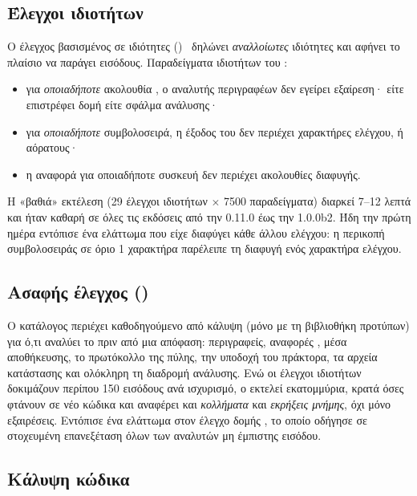 \subsection{Έλεγχοι ιδιοτήτων}

Ο έλεγχος βασισμένος σε ιδιότητες ()~\cite{claessen2000quickcheck,maciver2019hypothesis}
δηλώνει \emph{αναλλοίωτες} ιδιότητες και αφήνει το πλαίσιο να παράγει εισόδους.
Παραδείγματα ιδιοτήτων του \Probolos:

\begin{itemize}
  \item για \emph{οποιαδήποτε} ακολουθία , ο αναλυτής περιγραφέων δεν
        εγείρει εξαίρεση· είτε επιστρέφει δομή είτε σφάλμα ανάλυσης·
  \item για \emph{οποιαδήποτε} συμβολοσειρά, η έξοδος του  δεν
        περιέχει χαρακτήρες ελέγχου,  ή αόρατους·
  \item η αναφορά για οποιαδήποτε συσκευή δεν περιέχει ακολουθίες διαφυγής.
\end{itemize}

Η «βαθιά» εκτέλεση (29 έλεγχοι ιδιοτήτων $\times$ 7500 παραδείγματα) διαρκεί
7–12 λεπτά και ήταν καθαρή σε όλες τις εκδόσεις από την 0.11.0 έως την 1.0.0b2.
Ήδη την πρώτη ημέρα εντόπισε ένα ελάττωμα που είχε διαφύγει κάθε άλλου ελέγχου:
η περικοπή συμβολοσειράς σε όριο 1 χαρακτήρα παρέλειπε τη διαφυγή ενός
χαρακτήρα ελέγχου.

\subsection{Ασαφής έλεγχος ()}

Ο κατάλογος  περιέχει  καθοδηγούμενο από κάλυψη
(μόνο με τη βιβλιοθήκη προτύπων) για ό,τι αναλύει το \Probolos{} πριν από μια
απόφαση: περιγραφείς, αναφορές , μέσα αποθήκευσης, το πρωτόκολλο της
πύλης, την υποδοχή του πράκτορα, τα αρχεία κατάστασης και ολόκληρη τη διαδρομή
ανάλυσης. Ενώ οι έλεγχοι ιδιοτήτων δοκιμάζουν περίπου 150 εισόδους ανά
ισχυρισμό, ο  εκτελεί εκατομμύρια, κρατά όσες φτάνουν σε νέο κώδικα
και αναφέρει και \emph{κολλήματα} και \emph{εκρήξεις μνήμης}, όχι μόνο
εξαιρέσεις. Εντόπισε ένα ελάττωμα στον έλεγχο δομής , το οποίο οδήγησε
σε στοχευμένη επανεξέταση όλων των αναλυτών μη έμπιστης εισόδου.

\subsection{Κάλυψη κώδικα}


